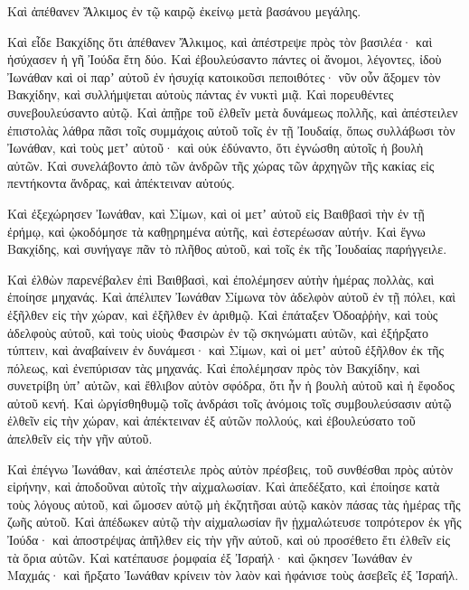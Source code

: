 {Καὶ ἀπέθανεν Ἄλκιμος ἐν τῷ καιρῷ ἐκείνῳ μετὰ βασάνου μεγάλης.
\par }{\PP {}Καὶ εἶδε Βακχίδης ὅτι ἀπέθανεν Ἄλκιμος, καὶ ἀπέστρεψε πρὸς τὸν βασιλέα· καὶ ἡσύχασεν ἡ γῆ Ἰούδα ἔτη δύο.
Καὶ ἐβουλεύσαντο πάντες οἱ ἄνομοι, λέγοντες, ἰδοὺ Ἰωνάθαν καὶ οἱ παρʼ αὐτοῦ ἐν ἡσυχίᾳ κατοικοῦσι πεποιθότες· νῦν οὖν ἄξομεν τὸν Βακχίδην, καὶ συλλήμψεται αὐτοὺς πάντας ἐν νυκτὶ μιᾷ.
Καὶ πορευθέντες συνεβουλεύσαντο αὐτῷ.
Καὶ ἀπῇρε τοῦ ἐλθεῖν μετὰ δυνάμεως πολλῆς, καὶ ἀπέστειλεν ἐπιστολὰς λάθρα πᾶσι τοῖς συμμάχοις αὐτοῦ τοῖς ἐν τῇ Ἰουδαίᾳ, ὅπως συλλάβωσι τὸν Ἰωνάθαν, καὶ τοὺς μετʼ αὐτοῦ· καὶ οὐκ ἐδύναντο, ὅτι ἐγνώσθη αὐτοῖς ἡ βουλὴ αὐτῶν.
Καὶ συνελάβοντο ἀπὸ τῶν ἀνδρῶν τῆς χώρας τῶν ἀρχηγῶν τῆς κακίας εἰς πεντήκοντα ἄνδρας, καὶ ἀπέκτειναν αὐτούς.
\par }{\PP {}Καὶ ἐξεχώρησεν Ἰωνάθαν, καὶ Σίμων, καὶ οἱ μετʼ αὐτοῦ εἰς Βαιθβασὶ τὴν ἐν τῇ ἐρήμῳ, καὶ ᾠκοδόμησε τὰ καθῃρημένα αὐτῆς, καὶ ἐστερέωσαν αὐτήν.
Καὶ ἔγνω Βακχίδης, καὶ συνήγαγε πᾶν τὸ πλῆθος αὐτοῦ, καὶ τοῖς ἐκ τῆς Ἰουδαίας παρήγγειλε.
\par }{\PP {}Καὶ ἐλθὼν παρενέβαλεν ἐπὶ Βαιθβασὶ, καὶ ἐπολέμησεν αὐτὴν ἡμέρας πολλὰς, καὶ ἐποίησε μηχανάς.
Καὶ ἀπέλιπεν Ἰωνάθαν Σίμωνα τὸν ἀδελφὸν αὐτοῦ ἐν τῇ πόλει, καὶ ἐξῆλθεν εἰς τὴν χώραν, καὶ ἐξῆλθεν ἐν ἀριθμῷ.
Καὶ ἐπάταξεν Ὀδοαῤῥὴν, καὶ τοὺς ἀδελφοὺς αὐτοῦ, καὶ τοὺς υἱοὺς Φασιρὼν ἐν τῷ σκηνώματι αὐτῶν, καὶ ἐξήρξατο τύπτειν, καὶ ἀναβαίνειν ἐν δυνάμεσι·
καὶ Σίμων, καὶ οἱ μετʼ αὐτοῦ ἐξῆλθον ἐκ τῆς πόλεως, καὶ ἐνεπύρισαν τὰς μηχανάς.
Καὶ ἐπολέμησαν πρὸς τὸν Βακχίδην, καὶ συνετρίβη ὑπʼ αὐτῶν, καὶ ἔθλιβον αὐτὸν σφόδρα, ὅτι ἦν ἡ βουλὴ αὐτοῦ καὶ ἡ ἔφοδος αὐτοῦ κενή.
Καὶ ὠργίσθηθυμῷ τοῖς ἀνδράσι τοῖς ἀνόμοις τοῖς συμβουλεύσασιν αὐτῷ ἐλθεῖν εἰς τὴν χώραν, καὶ ἀπέκτειναν ἐξ αὐτῶν πολλούς, καὶ ἐβουλεύσατο τοῦ ἀπελθεῖν εἰς τὴν γῆν αὐτοῦ.
\par }{\PP {}Καὶ ἐπέγνω Ἰωνάθαν, καὶ ἀπέστειλε πρὸς αὐτὸν πρέσβεις, τοῦ συνθέσθαι πρὸς αὐτὸν εἰρήνην, καὶ ἀποδοῦναι αὐτοῖς τὴν αἰχμαλωσίαν.
Καὶ ἀπεδέξατο, καὶ ἐποίησε κατὰ τοὺς λόγους αὐτοῦ, καὶ ὤμοσεν αὐτῷ μὴ ἐκζητῆσαι αὐτῷ κακὸν πάσας τὰς ἡμέρας τῆς ζωῆς αὐτοῦ.
Καὶ ἀπέδωκεν αὐτῷ τὴν αἰχμαλωσίαν ἣν ᾐχμαλώτευσε τοπρότερον ἐκ γῆς Ἰούδα· καὶ ἀποστρέψας ἀπῆλθεν εἰς τὴν γῆν αὐτοῦ, καὶ οὐ προσέθετο ἔτι ἐλθεῖν εἰς τὰ ὅρια αὐτῶν.
Καὶ κατέπαυσε ῥομφαία ἐξ Ἰσραήλ· καὶ ᾤκησεν Ἰωνάθαν ἐν Μαχμάς· καὶ ἤρξατο Ἰωνάθαν κρίνειν τὸν λαὸν καὶ ἠφάνισε τοὺς ἀσεβεῖς ἐξ Ἰσραήλ.

}
